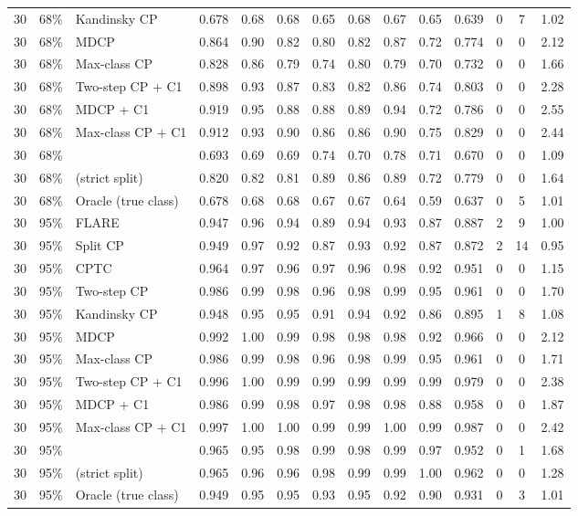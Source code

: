 \begin{longtable}{lllccccccccccc}
30 & 68\% & Kandinsky CP & 0.678 & 0.68 & 0.68 & 0.65 & 0.68 & 0.67 & 0.65 & 0.639 & 0 & 7 & 1.02 \\
30 & 68\% & MDCP & 0.864 & 0.90 & 0.82 & 0.80 & 0.82 & 0.87 & 0.72 & 0.774 & 0 & 0 & 2.12 \\
30 & 68\% & Max-class CP & 0.828 & 0.86 & 0.79 & 0.74 & 0.80 & 0.79 & 0.70 & 0.732 & 0 & 0 & 1.66 \\
30 & 68\% & Two-step CP + C1 & 0.898 & 0.93 & 0.87 & 0.83 & 0.82 & 0.86 & 0.74 & 0.803 & 0 & 0 & 2.28 \\
30 & 68\% & MDCP + C1 & 0.919 & 0.95 & 0.88 & 0.88 & 0.89 & 0.94 & 0.72 & 0.786 & 0 & 0 & 2.55 \\
30 & 68\% & Max-class CP + C1 & 0.912 & 0.93 & 0.90 & 0.86 & 0.86 & 0.90 & 0.75 & 0.829 & 0 & 0 & 2.44 \\
30 & 68\% & \gamut{} & 0.693 & 0.69 & 0.69 & 0.74 & 0.70 & 0.78 & 0.71 & 0.670 & 0 & 0 & 1.09 \\
30 & 68\% & \gamut{} (strict split) & 0.820 & 0.82 & 0.81 & 0.89 & 0.86 & 0.89 & 0.72 & 0.779 & 0 & 0 & 1.64 \\
30 & 68\% & Oracle (true class) & 0.678 & 0.68 & 0.68 & 0.67 & 0.67 & 0.64 & 0.59 & 0.637 & 0 & 5 & 1.01 \\
\midrule
30 & 95\% & FLARE & 0.947 & 0.96 & 0.94 & 0.89 & 0.94 & 0.93 & 0.87 & 0.887 & 2 & 9 & 1.00 \\
30 & 95\% & Split CP & 0.949 & 0.97 & 0.92 & 0.87 & 0.93 & 0.92 & 0.87 & 0.872 & 2 & 14 & 0.95 \\
30 & 95\% & CPTC & 0.964 & 0.97 & 0.96 & 0.97 & 0.96 & 0.98 & 0.92 & 0.951 & 0 & 0 & 1.15 \\
30 & 95\% & Two-step CP & 0.986 & 0.99 & 0.98 & 0.96 & 0.98 & 0.99 & 0.95 & 0.961 & 0 & 0 & 1.70 \\
30 & 95\% & Kandinsky CP & 0.948 & 0.95 & 0.95 & 0.91 & 0.94 & 0.92 & 0.86 & 0.895 & 1 & 8 & 1.08 \\
30 & 95\% & MDCP & 0.992 & 1.00 & 0.99 & 0.98 & 0.98 & 0.98 & 0.92 & 0.966 & 0 & 0 & 2.12 \\
30 & 95\% & Max-class CP & 0.986 & 0.99 & 0.98 & 0.96 & 0.98 & 0.99 & 0.95 & 0.961 & 0 & 0 & 1.71 \\
30 & 95\% & Two-step CP + C1 & 0.996 & 1.00 & 0.99 & 0.99 & 0.99 & 0.99 & 0.99 & 0.979 & 0 & 0 & 2.38 \\
30 & 95\% & MDCP + C1 & 0.986 & 0.99 & 0.98 & 0.97 & 0.98 & 0.98 & 0.88 & 0.958 & 0 & 0 & 1.87 \\
30 & 95\% & Max-class CP + C1 & 0.997 & 1.00 & 1.00 & 0.99 & 0.99 & 1.00 & 0.99 & 0.987 & 0 & 0 & 2.42 \\
30 & 95\% & \gamut{} & 0.965 & 0.95 & 0.98 & 0.99 & 0.98 & 0.99 & 0.97 & 0.952 & 0 & 1 & 1.68 \\
30 & 95\% & \gamut{} (strict split) & 0.965 & 0.96 & 0.96 & 0.98 & 0.99 & 0.99 & 1.00 & 0.962 & 0 & 0 & 1.28 \\
30 & 95\% & Oracle (true class) & 0.949 & 0.95 & 0.95 & 0.93 & 0.95 & 0.92 & 0.90 & 0.931 & 0 & 3 & 1.01 \\
\bottomrule
\end{longtable}
\par\endgroup
